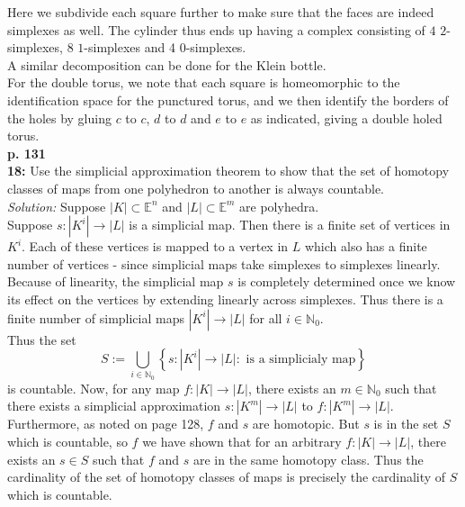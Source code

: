 \documentclass[a4paper]{article}
\begin{document}
    Here we subdivide each square further to make sure that the
    faces are indeed simplexes as well. The cylinder thus ends up
    having a complex consisting of $4$ $2$-simplexes,
    8 $1$-simplexes and 4 $0$-simplexes.\\
    A similar decomposition can be done for the Klein bottle.\\
    For the double torus, we note that each
    square is homeomorphic to the identification space for the punctured torus,
    and we then identify the borders of the holes by gluing $c$ to $c$,
    $d$ to $d$ and $e$ to $e$ as indicated, giving a double holed torus.\\
    \linebreak
    \textbf{p. 131}\\
    \textbf{18:} Use the simplicial approximation theorem to show that the set
    of homotopy classes of maps from one polyhedron to another is always
    countable.\\
    \linebreak
    \textit{Solution:} Suppose $\left| K \right| \subset 
    \mathbb{E}^{n}$ and $\left| L \right| 
    \subset \mathbb{E}^{m}$ are polyhedra.\\
    Suppose $s  \colon \left| K^{i}\right| 
    \to \left| L \right| $ is a simplicial map. Then
    there is a finite set of vertices in $K^{i}$. Each of these vertices is
    mapped to a vertex in $L$ which also has a finite number of vertices
    - since simplicial maps take simplexes to simplexes linearly.
    Because of linearity, the simplicial map $s$ is completely determined once
    we know its effect on the vertices by extending linearly across simplexes.
    Thus there is a finite number of simplicial maps
    $\left| K^{i} \right| \to \left| L \right| $ for all $i \in
    \mathbb{N}_0$.\\
    Thus the set 
    \[
    S := \bigcup_{i \in \mathbb{N}_0} \left\{ s  \colon
    \left| K^{i} \right| \to 
\left| L \right|   \colon  \text{ is a simplicialy map} \right\} 
    \] 
    is countable. Now, for any map
    $f  \colon \left| K \right| \to \left| L \right| $, there exists an
    $m \in \mathbb{N}_0$ such that there exists a simplicial approximation
    $s  \colon \left| K^{m} \right| \to \left| L \right| $ to
    $f  \colon \left| K^{m} \right| \to \left| L \right| $. Furthermore, as
    noted on page 128, $f$ and $s$ are homotopic. But $s$ is in the
    set $S$ which is countable, so $f$ we have shown that for an arbitrary
    $f  \colon \left| K \right| \to \left| L \right| $, there exists an
    $s \in S$ such that $f$ and $s$ are in the same homotopy class.
    Thus the cardinality of the set of homotopy classes of maps is
    precisely the cardinality of $S$ which is countable.
    
\end{document}
